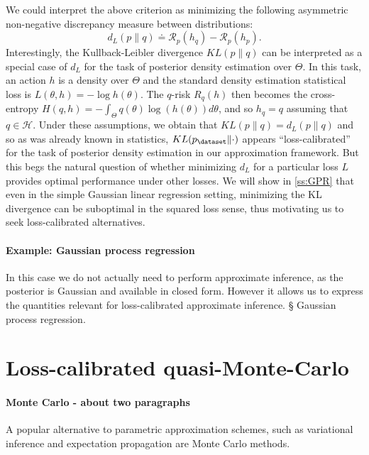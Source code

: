 We could interpret the above criterion as minimizing the following asymmetric non-negative discrepancy measure between distributions:
\begin{equation} \label{e:d_L}
    d_L(p\|q) \doteq \mathcal{R}_{p}(h_q) - \mathcal{R}_{p}(h_p).
\end{equation}
Interestingly, the Kullback-Leibler divergence $KL(p\|q)$ can be interpreted as a special case of $d_L$ for the task of posterior density estimation over $\Theta$. In this task, an action $h$ is a density over $\Theta$ and the standard density estimation statistical loss is $L(\theta,h) = -\log h(\theta)$. The $q$-risk $R_q(h)$ then becomes the cross-entropy $H(q,h)=-\int_\Theta q(\theta) \log(h(\theta)) d\theta$, and so $h_q = q$ assuming that $q \in \mathcal{H}$. Under these assumptions, we obtain that $KL(p\|q) = d_L(p\|q)$ and so as was already known in statistics, $KL(p_\dataset\|\cdot)$ appears ``loss-calibrated'' for the task of posterior density estimation in our approximation framework. But this begs the natural question of whether minimizing $d_L$ for a particular loss $L$ provides optimal performance under other losses. We will show in \ref{ss:GPR} that even in the simple Gaussian linear regression setting, minimizing the KL divergence can be suboptimal in the squared loss sense, thus motivating us to seek loss-calibrated alternatives.

\paragraph{Example: Gaussian process regression}

In this case we do not actually need to perform approximate inference, as the posterior is Gaussian and available in closed form. However it allows us to express the quantities relevant for loss-calibrated approximate inference.
§
Gaussian process regression.

\section{Loss-calibrated quasi-Monte-Carlo}

\paragraph{Monte Carlo - about two paragraphs}
A popular alternative to parametric approximation schemes, such as variational inference and expectation propagation are Monte Carlo methods.


